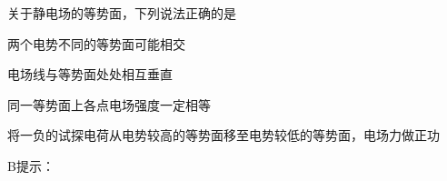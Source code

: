 关于静电场的等势面，下列说法正确的是\paren[]
\begin{choices}
	\item 两个电势不同的等势面可能相交
	\item 电场线与等势面处处相互垂直
	\item 同一等势面上各点电场强度一定相等
	\item 将一负的试探电荷从电势较高的等势面移至电势较低的等势面，电场力做正功
\end{choices}
\begin{answer}
	B\qquad 提示：
\end{answer}